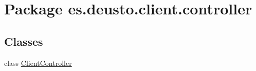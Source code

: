 \hypertarget{namespacees_1_1deusto_1_1client_1_1controller}{}\section{Package es.\+deusto.\+client.\+controller}
\label{namespacees_1_1deusto_1_1client_1_1controller}
\subsection*{Classes}
\begin{DoxyCompactItemize}
\item 
class \mbox{\hyperlink{classes_1_1deusto_1_1client_1_1controller_1_1_client_controller}{Client\+Controller}}
\end{DoxyCompactItemize}
